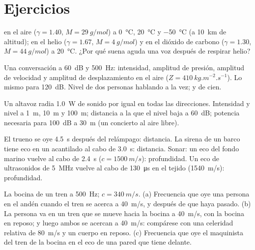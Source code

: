 \section{Ejercicios}

\begin{exercise}[$\star$]\label{exo:b2:sound-waves:1}
 en el aire ($\gamma = 1.40$, $M = \qty{29}{g/mol}$) a
\qty{0}{\degreeCelsius}, \qty{20}{\degreeCelsius} y \qty{-50}{\degreeCelsius}
(a \qty{10}{km} de altitud); en el helio ($\gamma = 1.67$, $M = \qty{4}{g/mol}$) y
en el dióxido de carbono ($\gamma = 1.30$, $M = \qty{44}{g/mol}$) a \qty{20}{\degreeCelsius}.
¿Por qué suena aguda una voz después de respirar helio?
\end{exercise}

\begin{exercise}[$\star$]\label{exo:b2:sound-waves:2}
Una conversación a \qty{60}{dB} y \qty{500}{Hz}: intensidad, amplitud de
presión, amplitud de velocidad y amplitud de desplazamiento en el aire
($Z = \qty{410}{kg.m^{-2}.s^{-1}}$). Lo mismo para \qty{120}{dB}. Nivel de dos
personas hablando a la vez; y de cien.
\end{exercise}

\begin{exercise}[$\star$]\label{exo:b2:sound-waves:3}
Un altavoz radia \qty{1.0}{W} de sonido por igual en todas las direcciones.
Intensidad y nivel a \qty{1}{m}, \qty{10}{m} y \qty{100}{m}; distancia a la que
el nivel baja a \qty{60}{dB}; potencia necesaria para \qty{100}{dB} a \qty{30}{m}
(un concierto al aire libre).
\end{exercise}

\begin{exercise}[$\star$]\label{exo:b2:sound-waves:4}
El trueno se oye \qty{4.5}{s} después del relámpago: distancia. La sirena de
un barco tiene eco en un acantilado al cabo de \qty{3.0}{s}: distancia.
Sonar: un eco del fondo marino vuelve al cabo de \qty{2.4}{s} ($c = \qty{1500}{m/s}$): profundidad. Un eco de ultrasonidos de
\qty{5}{MHz} vuelve al cabo de \qty{130}{\micro s} en el tejido
(\qty{1540}{m/s}): profundidad.
\end{exercise}

\begin{exercise}[$\star\star$]\label{exo:b2:sound-waves:5}
La bocina de un tren a \qty{500}{Hz}; $c = \qty{340}{m/s}$. (a) Frecuencia que
oye una persona en el andén cuando el tren se acerca a \qty{40}{m/s}, y
después de que haya pasado. (b) La persona va en un tren que se mueve
hacia la bocina a \qty{40}{m/s}, con la bocina en reposo; y luego ambos se
acercan a \qty{40}{m/s}: compárese con una celeridad relativa de
\qty{80}{m/s} y un cuerpo en reposo. (c) Frecuencia que oye el maquinista
del tren de la bocina en el eco de una pared que tiene delante.
\end{exercise}

